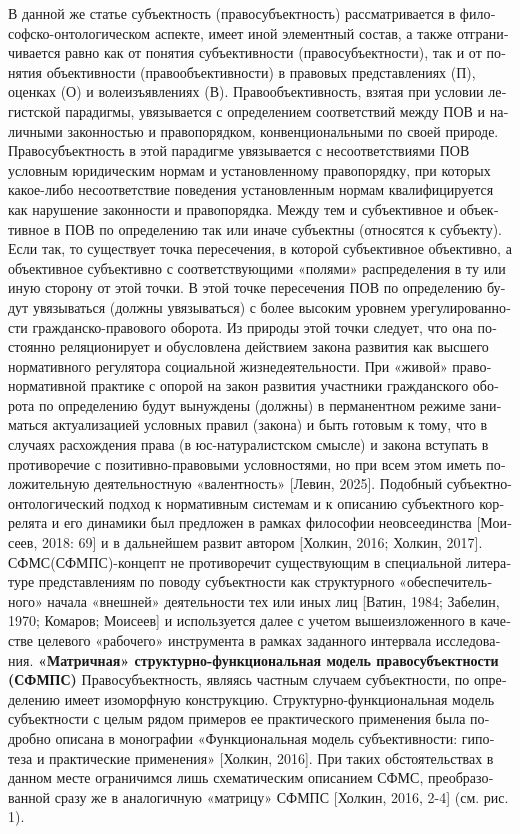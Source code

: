 \begin{russian}
    В данной же статье субъектность (правосубъектность) рассматривается в философско-онтологическом аспекте, имеет иной элементный состав, а также отграничивается равно как от понятия субъективности (правосубъектности), так и от понятия объективности (правообъективности) в правовых представлениях (П), оценках (О) и волеизъявлениях (В). Правообъективность, взятая при условии легистской парадигмы, увязывается с определением соответствий между ПОВ и наличными законностью и правопорядком, конвенциональными по своей природе. Правосубъектность в этой парадигме увязывается с несоответствиями ПОВ условным юридическим нормам и установленному правопорядку, при которых какое-либо несоответствие поведения установленным нормам квалифицируется как нарушение законности и правопорядка. Между тем и субъективное и объективное в ПОВ по определению так или иначе субъектны (относятся к субъекту). Если так, то существует точка пересечения, в которой субъективное объективно, а объективное субъективно с соответствующими «полями» распределения в ту или иную сторону от этой точки. В этой точке пересечения ПОВ по определению будут увязываться (должны увязываться) с более высоким уровнем урегулированности гражданско-правового оборота. Из природы этой точки следует, что она постоянно реляционирует и обусловлена действием закона развития как высшего нормативного регулятора социальной жизнедеятельности.   При «живой» правонормативной практике с опорой на закон развития участники гражданского оборота по определению будут вынуждены (должны) в перманентном режиме заниматься  актуализацией условных правил (закона) и быть готовым к тому, что в случаях расхождения права (в юс-натуралистском смысле) и закона вступать в противоречие с позитивно-правовыми условностями, но при всем этом  иметь  положительную деятельностную «валентность» [Левин, 2025]. Подобный субъектно-онтологический подход к нормативным системам и к описанию субъектного коррелята и его динамики был предложен в рамках философии неовсеединства [Моисеев, 2018: 69] и в дальнейшем развит автором [Холкин, 2016; Холкин, 2017].
    СФМС(СФМПС)-концепт не противоречит существующим в специальной литературе представлениям по поводу субъектности как структурного «обеспечительного» начала «внешней» деятельности тех или иных лиц [Ватин, 1984; Забелин, 1970; Комаров; Моисеев] и используется далее с учетом вышеизложенного в качестве целевого «рабочего» инструмента в рамках заданного интервала исследования. 
    \textbf{«Матричная» структурно-функциональная модель правосубъектности (СФМПС)}
    Правосубъектность, являясь частным случаем субъектности, по определению имеет изоморфную конструкцию. Структурно-функциональная модель субъектности с целым рядом примеров ее практического применения была подробно описана в монографии «Функциональная модель субъективности: гипотеза и практические применения» [Холкин, 2016]. При таких обстоятельствах в данном месте ограничимся лишь схематическим описанием СФМС, преобразованной сразу же в аналогичную «матрицу» СФМПС [Холкин, 2016, 2-4] (см. рис. 1).
     

\end{russian}
